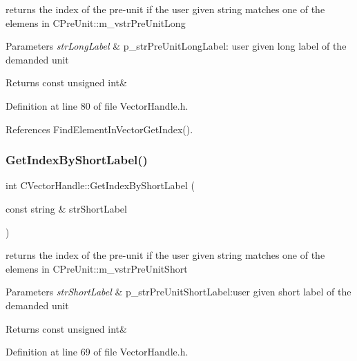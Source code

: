 returns the index of the pre-\/unit if the user given string matches one of the elemens in C\+Pre\+Unit\+::m\+\_\+vstr\+Pre\+Unit\+Long 


\begin{DoxyParams}{Parameters}
{\em str\+Long\+Label} & p\+\_\+str\+Pre\+Unit\+Long\+Label\+: user given long label of the demanded unit \\
\hline
\end{DoxyParams}
\begin{DoxyReturn}{Returns}
const unsigned int\& 
\end{DoxyReturn}


Definition at line 80 of file Vector\+Handle.\+h.



References Find\+Element\+In\+Vector\+Get\+Index().

\mbox{\label{classCVectorHandle_ab1c2a8cb7d2f87077c6be60a86e2ae16}} 
\subsubsection{\texorpdfstring{Get\+Index\+By\+Short\+Label()}{GetIndexByShortLabel()}}
{\footnotesize\ttfamily int C\+Vector\+Handle\+::\+Get\+Index\+By\+Short\+Label (\begin{DoxyParamCaption}\item[{const string \&}]{str\+Short\+Label }\end{DoxyParamCaption})\hspace{0.3cm}{\ttfamily [inline]}}



returns the index of the pre-\/unit if the user given string matches one of the elemens in C\+Pre\+Unit\+::m\+\_\+vstr\+Pre\+Unit\+Short 


\begin{DoxyParams}{Parameters}
{\em str\+Short\+Label} & p\+\_\+str\+Pre\+Unit\+Short\+Label\+:user given short label of the demanded unit \\
\hline
\end{DoxyParams}
\begin{DoxyReturn}{Returns}
const unsigned int\& 
\end{DoxyReturn}


Definition at line 69 of file Vector\+Handle.\+h.



